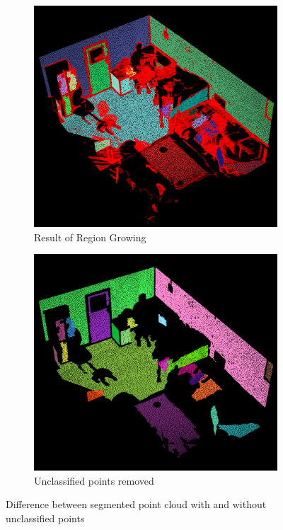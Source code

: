 		
		\begin{figure}[H]
			
			\centering
			
			\begin{subfigure}{.5\textwidth}
				\centering
				\includegraphics[width=0.9\linewidth]{Includes/images/GrownRegions}
				\caption{Result of Region Growing}
				
			\end{subfigure}%
			\begin{subfigure}{.5\textwidth}
				\centering
				\includegraphics[width=0.9\linewidth]{Includes/images/RG-noUnclass}
				\caption{Unclassified points removed}
				
			\end{subfigure}
			\label{1}
			\caption{Difference between segmented point cloud with and without unclassified points}
		\end{figure} 
		
